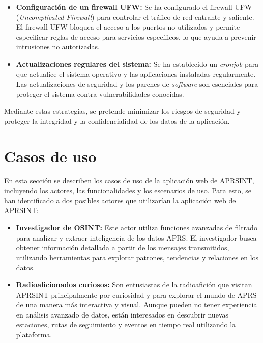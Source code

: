 \begin{itemize}
	\item \textbf{Configuración de un firewall UFW:} Se ha configurado el firewall UFW (\textit{Uncomplicated Firewall}) para controlar el tráfico de red entrante y saliente. El firewall UFW bloquea el acceso a los puertos no utilizados y permite especificar reglas de acceso para servicios específicos, lo que ayuda a prevenir intrusiones no autorizadas.

	\item \textbf{Actualizaciones regulares del sistema:} Se ha establecido un \textit{cronjob} para que actualice el sistema operativo y las aplicaciones instaladas regularmente. Las actualizaciones de seguridad y los parches de \textit{software} son esenciales para proteger el sistema contra vulnerabilidades conocidas.
\end{itemize}

\noindent Mediante estas estrategias, se pretende minimizar los riesgos de seguridad y proteger la integridad y la confidencialidad de los datos de la aplicación.

\section{Casos de uso}

En esta sección se describen los casos de uso de la aplicación web de APRSINT, incluyendo los actores, las funcionalidades y los escenarios de uso. Para esto, se han identificado a dos posibles actores que utilizarían la aplicación web de APRSINT:
\begin{itemize}
	\item \textbf{Investigador de OSINT:} Este actor utiliza funciones avanzadas de filtrado para analizar y extraer inteligencia de los datos APRS. El investigador busca obtener información detallada a partir de los mensajes transmitidos, utilizando herramientas para explorar patrones, tendencias y relaciones en los datos.
	\item \textbf{Radioaficionados curiosos:} Son entusiastas de la radioafición que visitan APRSINT principalmente por curiosidad y para explorar el mundo de APRS de una manera más interactiva y visual. Aunque pueden no tener experiencia en análisis avanzado de datos, están interesados en descubrir nuevas estaciones, rutas de seguimiento y eventos en tiempo real utilizando la plataforma.
\end{itemize}

